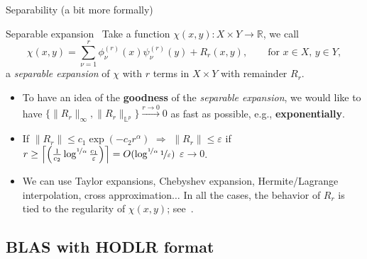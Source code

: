 \documentclass[aspectratio=169,xcolor=dvipsnames]{beamer}
\begin{document}
	\begin{frame}{Separability (a bit more formally)}
	
	\begin{alertblock}{Separable expansion~\parencite[Definition 4.4]{MR3445676}}
	Take a function $\chi(x,y) : X \times Y \rightarrow \mathbb{R}$, we call 
	\[
	\chi(x,y) = \sum_{\nu = 1}^{r} \phi_\nu^{(r)}(x) \psi_{\nu}^{(r)}(y) + R_r(x,y), \qquad \text{for }x \in X,\,y \in Y,
	\]
	a \emph{separable expansion} of $\chi$ with $r$ terms in $X \times Y$ with remainder $R_r$.
	\end{alertblock}
	\begin{itemize}
		\item[\faWrench]<1-> To have an idea of the \textbf{goodness} of the \emph{separable expansion}, we would like to have $\{\|R_r\|_{\infty},\|R_r\|_{\mathbb{L}^p}\} \overset{r \rightarrow 0}{\longrightarrow} 0$ \alert{as fast as possible}, e.g., \textbf{exponentially}.
		\item[\faCog]<2-> If $\|R_r\| \leq c_1 \exp( - c_2 r^\alpha)$ $\Rightarrow$ $\| R_r \| \leq \varepsilon$ if $r \geq \left\lceil \left( \frac{1}{c_2} \log^{\nicefrac{1}{\alpha}} \frac{c_1}{\varepsilon} \right) \right\rceil = O( \log^{\nicefrac{1}{\alpha}} \nicefrac{1}{\varepsilon} )$ $\varepsilon \rightarrow 0$.
		\item[\faHammer]<3-> We can use Taylor expansions, Chebyshev expansion, Hermite/Lagrange interpolation, cross approximation$\ldots$ In all the cases, the behavior of $R_r$ is tied to the regularity of $\chi(x,y)$; see~\parencite[Chapter~4]{MR3445676}.
	\end{itemize}
	
	\end{frame}

	\subsection{BLAS with HODLR format}
\end{document}
